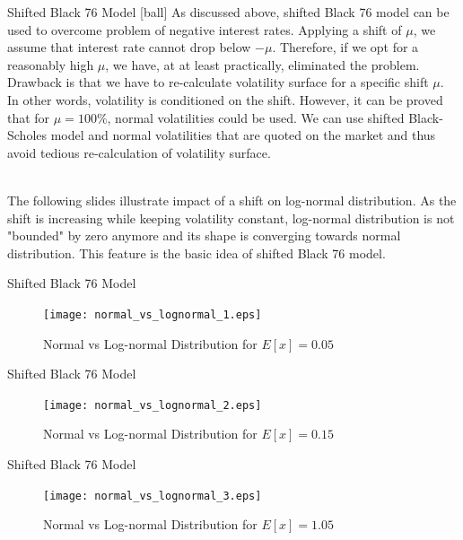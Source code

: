 \documentclass{beamer}
\begin{document}
\begin{frame}{Shifted Black 76 Model}
[ball]
As discussed above, shifted Black 76 model can be used to overcome problem of negative interest rates. Applying a shift of $\mu$, we assume that interest rate cannot drop below $-\mu$. Therefore, if we opt for a reasonably high $\mu$, we have, at at least practically, eliminated the problem. Drawback is that we have to re-calculate volatility surface for a specific shift $\mu$. In other words, volatility is conditioned on the shift. However, it can be proved that for $\mu = 100\%$, normal volatilities could be used. We can use shifted Black-Scholes model and normal volatilities that are quoted on the market and thus avoid tedious re-calculation of volatility surface.

\mbox{}\\
The following slides illustrate impact of a shift on log-normal distribution. As the shift is increasing while keeping volatility constant, log-normal distribution is not "bounded" by zero anymore and its shape is converging towards normal distribution. This feature is the basic idea of shifted Black 76 model.
\end{frame}

\begin{frame}{Shifted Black 76 Model}
\begin{figure}[htp]
\centering
\texttt{[image: normal\_vs\_lognormal\_1.eps]}
\caption{Normal vs Log-normal Distribution for $E[x] = 0.05$}
\label{normal_vs_lognormal_1}
\end{figure}
\end{frame}

\begin{frame}{Shifted Black 76 Model}
\begin{figure}[htp]
\centering
\texttt{[image: normal\_vs\_lognormal\_2.eps]}
\caption{Normal vs Log-normal Distribution for $E[x] = 0.15$}
\label{normal_vs_lognormal_2}
\end{figure}
\end{frame}

\begin{frame}{Shifted Black 76 Model}
\begin{figure}[htp]
\centering
\texttt{[image: normal\_vs\_lognormal\_3.eps]}
\caption{Normal vs Log-normal Distribution for $E[x] = 1.05$}
\label{normal_vs_lognormal_3}
\end{figure}
\end{frame}
\end{document}
